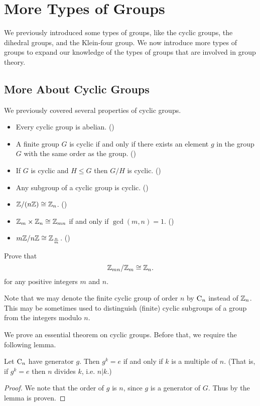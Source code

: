 \chapter{More Types of Groups}
We previously introduced some types of groups, like the cyclic groups, the dihedral groups, and the Klein-four group. We now introduce more types of groups to expand our knowledge of the types of groups that are involved in group theory.

\section{More About Cyclic Groups}\label{section-cyclic-groups}
We previously covered several properties of cyclic groups.
\begin{itemize}
    \item Every cyclic group is abelian. ()
    \item A finite group $G$ is cyclic if and only if there exists an element $g$ in the group $G$ with the same order as the group. ()
    \item If $G$ is cyclic and $H \leq G$ then $G/H$ is cyclic. ()
    \item Any subgroup of a cyclic group is cyclic. ()
    \item $\mathbb{Z} / (n\mathbb{Z}) \cong \mathbb{Z}_n$. ()
    \item $\mathbb{Z}_m \times \mathbb{Z}_n \cong \mathbb{Z}_{mn}$ if and only if $\gcd(m,n) = 1$. ()
    \item $m\mathbb{Z} / n\mathbb{Z} \cong \mathbb{Z}_{\frac nm}$. ()
\end{itemize}

\begin{exercise}\label{exercise-Zmn-mod-Zn-cong-Zn}
    Prove that
    \[
        \mathbb{Z}_{mn} / \mathbb{Z}_m \cong \mathbb{Z}_n.
    \]
    for any positive integers $m$ and $n$.
\end{exercise}

Note that we may denote the finite cyclic group of order $n$ by $\mathrm{C}_{n}$ instead of $\mathbb{Z}_n$. This may be sometimes used to distinguish (finite) cyclic subgroups of a group from the integers modulo $n$.

We prove an essential theorem on cyclic groups. Before that, we require the following lemma.
\begin{lemma}\label{lemma-order-of-an-element-that-is-equivalent-to-identity}
    Let $\mathrm{C}_{n}$ have generator $g$. Then $g^k = e$ if and only if $k$ is a multiple of $n$.\newline
    (That is, if $g^k = e$ then $n$ divides $k$, i.e. $n\vert k$.)
\end{lemma}
\begin{proof}
    We note that the order of $g$ is $n$, since $g$ is a generator of $G$. Thus by  the lemma is proven.
\end{proof}

